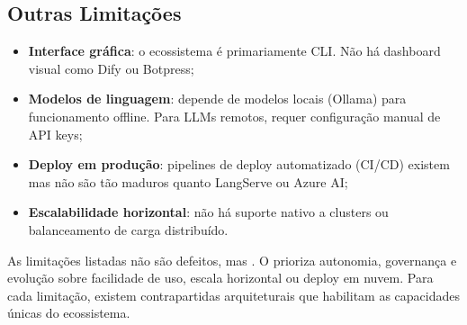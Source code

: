 \subsection{Outras Limitações}
\begin{itemize}
\item \textbf{Interface gráfica}: o ecossistema é primariamente
CLI. Não há dashboard visual como Dify ou Botpress;
\item \textbf{Modelos de linguagem}: depende de modelos locais
(Ollama) para funcionamento offline. Para LLMs remotos,
requer configuração manual de API keys;
\item \textbf{Deploy em produção}: pipelines de deploy
automatizado (CI/CD) existem mas não são tão maduros quanto
LangServe ou Azure AI;
\item \textbf{Escalabilidade horizontal}: não há suporte nativo a
clusters ou balanceamento de carga distribuído.
\end{itemize}
\begin{observacao}
As limitações listadas não são defeitos, mas . O \opencodeeco{} prioriza autonomia, governança e evolução
sobre facilidade de uso, escala horizontal ou deploy em nuvem. Para
cada limitação, existem contrapartidas arquiteturais que habilitam as
capacidades únicas do ecossistema.
\end{observacao}
